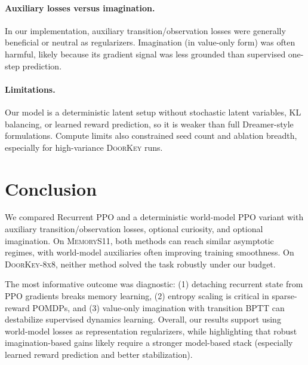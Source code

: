 \paragraph{Auxiliary losses versus imagination.}
In our implementation, auxiliary transition/observation losses were generally beneficial or neutral as regularizers. Imagination (in value-only form) was often harmful, likely because its gradient signal was less grounded than supervised one-step prediction.

\paragraph{Limitations.}
Our model is a deterministic latent setup without stochastic latent variables, KL balancing, or learned reward prediction, so it is weaker than full Dreamer-style formulations. Compute limits also constrained seed count and ablation breadth, especially for high-variance \textsc{DoorKey} runs.

\section{Conclusion}

We compared Recurrent PPO and a deterministic world-model PPO variant with auxiliary transition/observation losses, optional curiosity, and optional imagination. On \textsc{MemoryS11}, both methods can reach similar asymptotic regimes, with world-model auxiliaries often improving training smoothness. On \textsc{DoorKey-8x8}, neither method solved the task robustly under our budget.

The most informative outcome was diagnostic: (1) detaching recurrent state from PPO gradients breaks memory learning, (2) entropy scaling is critical in sparse-reward POMDPs, and (3) value-only imagination with transition BPTT can destabilize supervised dynamics learning. Overall, our results support using world-model losses as representation regularizers, while highlighting that robust imagination-based gains likely require a stronger model-based stack (especially learned reward prediction and better stabilization).
